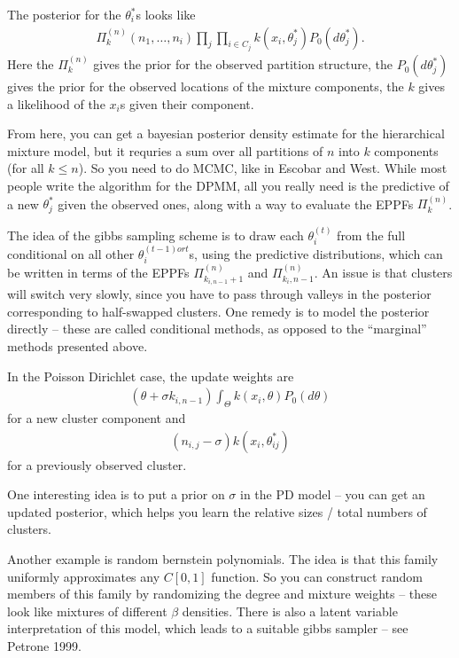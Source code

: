 \documentclass{article}
\begin{document}
The posterior for the $\theta_{i}^{\ast}$s looks like
\begin{align}
\Pi_{k}^{(n)}\left(n_{1}, \dots, n_{i}\right) \prod_{j} \prod_{i \in C_{j}} k\left(x_{i}, \theta_{j}^{\ast}\right) P_{0}\left(d\theta_{j}^{\ast}\right).
\end{align}
Here the $\Pi_{k}^{(n)}$ gives the prior for the observed partition structure,
the $P_{0}\left(d\theta_{j}^{\ast}\right)$ gives the prior for the observed
locations of the mixture components, the $k$ gives a likelihood of the $x_{i}$s
given their component.

From here, you can get a bayesian posterior density estimate for the
hierarchical mixture model, but it requries a sum over all partitions of $n$
into $k$ components (for all $k \leq n$). So you need to do MCMC, like in
Escobar and West. While most people write the algorithm for the DPMM, all you
really need is the predictive of a new $\theta_{j}^{\ast}$ given the observed
ones, along with a way to evaluate the EPPFs $\Pi_{k}^{(n)}$.

The idea of the gibbs sampling scheme is to draw each $\theta_{i}^{(t)}$ from
the full conditional on all other $\theta_{i}^{(t-1) or t}$s, using the
predictive distributions, which can be written in terms of the EPPFs
$\Pi_{k_{i, n - 1} + 1}^{(n)}$ and $\Pi_{k_{i}, n -1}^{(n)}$. An issue is that
clusters will switch very slowly, since you have to pass through valleys in the
posterior corresponding to half-swapped clusters. One remedy is to model the
posterior directly -- these are called conditional methods, as opposed to the
``marginal'' methods presented above.

In the Poisson Dirichlet case, the update weights are
\begin{align}
\left(\theta + \sigma k_{i, n - 1}\right) \int_{\Theta}k\left(x_{i}, \theta\right)P_{0}\left(d\theta\right)
\end{align}
for a new cluster component and
\begin{align}
\left(n_{i, j} - \sigma\right)k\left(x_{i}, \theta_{ij}^{\ast}\right)
\end{align}
for a previously observed cluster.

One interesting idea is to put a prior on $\sigma$ in the PD model -- you can
get an updated posterior, which helps you learn the relative sizes / total
numbers of clusters.

Another example is random bernstein polynomials. The idea is that this family
uniformly approximates any $C\left[0, 1\right]$ function. So you can construct
random members of this family by randomizing the degree and mixture weights --
these look like mixtures of different $\beta$ densities. There is also a latent
variable interpretation of this model, which leads to a suitable gibbs sampler
-- see Petrone 1999.
\end{document}
